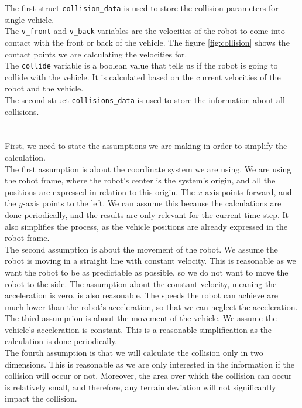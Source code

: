         The first struct \texttt{collision\_data} is used to store the collision parameters for single vehicle.\\
        The \texttt{v\_front} and \texttt{v\_back} variables are the velocities of the robot to come into contact with the front or back of the vehicle. The figure \ref{fig:collision} shows the contact points we are calculating the velocities for.\\
        The \texttt{collide} variable is a boolean value that tells us if the robot is going to collide with the vehicle. It is calculated based on the current velocities of the robot and the vehicle.\\
        The second struct \texttt{collisions\_data} is used to store the information about all collisions.\\\\
    \\
        First, we need to state the assumptions we are making in order to simplify the calculation.\\
        The first assumption is about the coordinate system we are using. We are using the robot frame, where the robot's center is the system's origin, and all the positions are expressed in relation to this origin. The $x$-axis points forward, and the $y$-axis points to the left. We can assume this because the calculations are done periodically, and the results are only relevant for the current time step. It also simplifies the process, as the vehicle positions are already expressed in the robot frame.\\
        The second assumption is about the movement of the robot. We assume the robot is moving in a straight line with constant velocity. This is reasonable as we want the robot to be as predictable as possible, so we do not want to move the robot to the side. The assumption about the constant velocity, meaning the acceleration is zero, is also reasonable. The speeds the robot can achieve are much lower than the robot's acceleration, so that we can neglect the acceleration.\\
        The third assumprion is about the movement of the vehicle. We assume the vehicle's acceleration is constant. This is a reasonable simplification as the calculation is done periodically.\\
        The fourth assumption is that we will calculate the collision only in two dimensions. This is reasonable as we are only interested in the information if the collision will occur or not. Moreover, the area over which the collision can occur is relatively small, and therefore, any terrain deviation will not significantly impact the collision.\\\\
